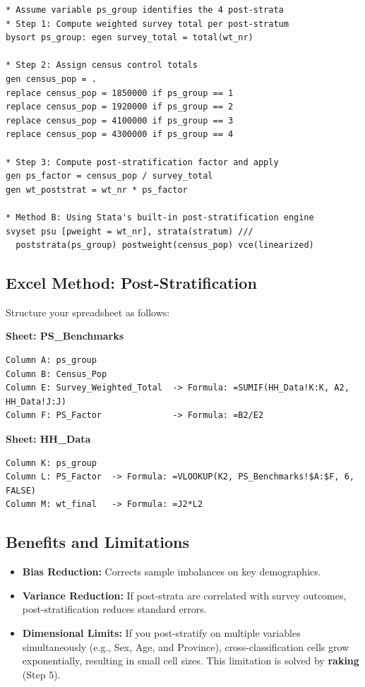 \documentclass[11pt,a4paper]{article}
\begin{document}
\begin{lstlisting}[style=stata, caption={Post-Stratification in Stata}]
* Assume variable ps_group identifies the 4 post-strata
* Step 1: Compute weighted survey total per post-stratum
bysort ps_group: egen survey_total = total(wt_nr)

* Step 2: Assign census control totals
gen census_pop = .
replace census_pop = 1850000 if ps_group == 1
replace census_pop = 1920000 if ps_group == 2
replace census_pop = 4100000 if ps_group == 3
replace census_pop = 4300000 if ps_group == 4

* Step 3: Compute post-stratification factor and apply
gen ps_factor = census_pop / survey_total
gen wt_poststrat = wt_nr * ps_factor

* Method B: Using Stata's built-in post-stratification engine
svyset psu [pweight = wt_nr], strata(stratum) ///
  poststrata(ps_group) postweight(census_pop) vce(linearized)
\end{lstlisting}

\subsection{Excel Method: Post-Stratification}
Structure your spreadsheet as follows:

\textbf{Sheet: PS\_Benchmarks}
\begin{lstlisting}[style=excel, caption={Excel Formulas for Post-Stratification Benchmarks}]
Column A: ps_group
Column B: Census_Pop
Column E: Survey_Weighted_Total  -> Formula: =SUMIF(HH_Data!K:K, A2, HH_Data!J:J)
Column F: PS_Factor              -> Formula: =B2/E2
\end{lstlisting}

\textbf{Sheet: HH\_Data}
\begin{lstlisting}[style=excel, caption={Excel Formulas for Post-Stratified Weights}]
Column K: ps_group
Column L: PS_Factor  -> Formula: =VLOOKUP(K2, PS_Benchmarks!$A:$F, 6, FALSE)
Column M: wt_final   -> Formula: =J2*L2
\end{lstlisting}

\newpage

\subsection{Benefits and Limitations}
\begin{itemize}
  \item \textbf{Bias Reduction:} Corrects sample imbalances on key demographics.
  \item \textbf{Variance Reduction:} If post-strata are correlated with survey outcomes, post-stratification reduces standard errors.
  \item \textbf{Dimensional Limits:} If you post-stratify on multiple variables simultaneously (e.g., Sex, Age, and Province), cross-classification cells grow exponentially, resulting in small cell sizes. This limitation is solved by \textbf{raking} (Step 5).
\end{itemize}
\end{document}
